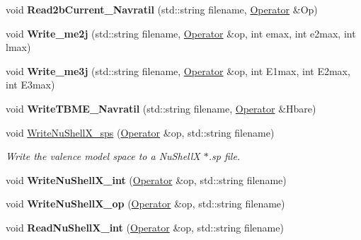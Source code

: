 \begin{DoxyCompactItemize}
\item 
\hypertarget{classReadWrite_a35b62568c269af2bd24ee1793fe2099e}{void {\bfseries Read2b\-Current\-\_\-\-Navratil} (std\-::string filename, \hyperlink{classOperator}{Operator} \&Op)}\label{classReadWrite_a35b62568c269af2bd24ee1793fe2099e}

\item 
\hypertarget{classReadWrite_a9bf725085e4eff9e08bc520d05304b11}{void {\bfseries Write\-\_\-me2j} (std\-::string filename, \hyperlink{classOperator}{Operator} \&op, int emax, int e2max, int lmax)}\label{classReadWrite_a9bf725085e4eff9e08bc520d05304b11}

\item 
\hypertarget{classReadWrite_ae819eac7b4bfc06bb97c2e784d8cd970}{void {\bfseries Write\-\_\-me3j} (std\-::string filename, \hyperlink{classOperator}{Operator} \&op, int E1max, int E2max, int E3max)}\label{classReadWrite_ae819eac7b4bfc06bb97c2e784d8cd970}

\item 
\hypertarget{classReadWrite_ab28536eec0349d76457a727f0648da11}{void {\bfseries Write\-T\-B\-M\-E\-\_\-\-Navratil} (std\-::string filename, \hyperlink{classOperator}{Operator} \&Hbare)}\label{classReadWrite_ab28536eec0349d76457a727f0648da11}

\item 
\hypertarget{classReadWrite_a68209a59a849e3e43b5953943b2f7e0a}{void \hyperlink{classReadWrite_a68209a59a849e3e43b5953943b2f7e0a}{Write\-Nu\-Shell\-X\-\_\-sps} (\hyperlink{classOperator}{Operator} \&op, std\-::string filename)}\label{classReadWrite_a68209a59a849e3e43b5953943b2f7e0a}

\begin{DoxyCompactList}\small\item\em Write the valence model space to a Nu\-Shell\-X $\ast$.sp file. \end{DoxyCompactList}\item 
\hypertarget{classReadWrite_a578d5eea626bba51eb51619082ab1045}{void {\bfseries Write\-Nu\-Shell\-X\-\_\-int} (\hyperlink{classOperator}{Operator} \&op, std\-::string filename)}\label{classReadWrite_a578d5eea626bba51eb51619082ab1045}

\item 
\hypertarget{classReadWrite_a95026acf75e0d9921e5d074bc77115cd}{void {\bfseries Write\-Nu\-Shell\-X\-\_\-op} (\hyperlink{classOperator}{Operator} \&op, std\-::string filename)}\label{classReadWrite_a95026acf75e0d9921e5d074bc77115cd}

\item 
\hypertarget{classReadWrite_a3b79358eeb90f854abf61c257dc4bfcf}{void {\bfseries Read\-Nu\-Shell\-X\-\_\-int} (\hyperlink{classOperator}{Operator} \&op, std\-::string filename)}\label{classReadWrite_a3b79358eeb90f854abf61c257dc4bfcf}


\end{DoxyCompactItemize}
